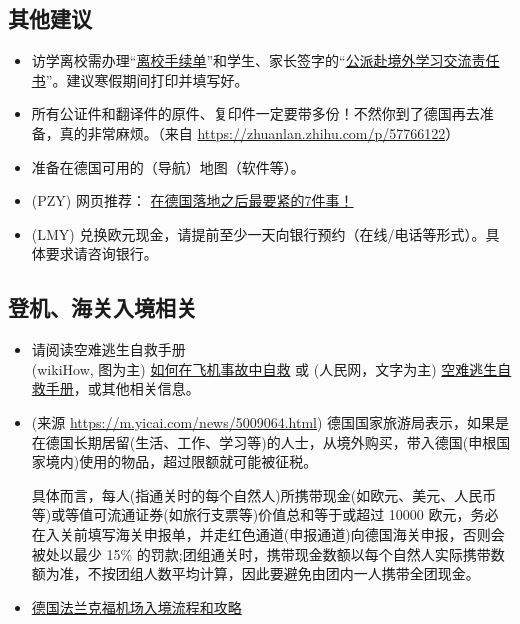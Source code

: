 \documentclass{ctexart}
\begin{document}
\subsection{其他建议}
\begin{itemize}
  \item 访学离校需办理“\href{http://bkjy.ucas.ac.cn/index.php/fxjl/download/3401-2017-06-13-03-47-14?task=down&fid=818}{离校手续单}”和学生、家长签字的“\href{http://bkjy.ucas.ac.cn/index.php/fxjl/download/3400-2017-06-13-03-46-26?task=down&fid=701}{公派赴境外学习交流责任书}”。建议寒假期间打印并填写好。
  \item 所有公证件和翻译件的原件、复印件一定要带多份！不然你到了德国再去准备，真的非常麻烦。（来自 \url{https://zhuanlan.zhihu.com/p/57766122}）
  \item 准备在德国可用的（导航）地图（软件等）。
  \item (PZY) 网页推荐： \href{https://mp.weixin.qq.com/s?srcid=0319fCMV7x6jt2w4xgPGYSMm&scene=23&mid=2651269086&sn=2b9eff5e72b2e989ac404be9be21bc09&idx=2&__biz=MzA4NTM2MzAxNw%3D%3D&chksm=842a97f8b35d1eee47778e42c10d883071d1546d6bab41132685fd4c983a6d713ca70a9b2328&mpshare=1#rd&appinstall=0}{在德国落地之后最要紧的7件事！}
  \item (LMY) 兑换欧元现金，请提前至少一天向银行预约（在线/电话等形式）。具体要求请咨询银行。
\end{itemize}


\subsection{登机、海关入境相关}
\begin{itemize}
\item 请阅读空难逃生自救手册 \\
(wikiHow, 图为主) \href{https://zh.wikihow.com/\%E5\%9C\%A8\%E9\%A3\%9E\%E6\%9C\%BA\%E4\%BA\%8B\%E6\%95\%85\%E4\%B8\%AD\%E8\%87\%AA\%E6\%95\%91}{如何在飞机事故中自救} 或 (人民网，文字为主) \href{http://travel.people.com.cn/n/2014/0725/c41570-25344422.html}{空难逃生自救手册}，或其他相关信息。
\item (来源 \url{https://m.yicai.com/news/5009064.html}) 德国国家旅游局表示，如果是在德国长期居留(生活、工作、学习等)的人士，从境外购买，带入德国(申根国家境内)使用的物品，超过限额就可能被征税。

具体而言，每人(指通关时的每个自然人)所携带现金(如欧元、美元、人民币等)或等值可流通证券(如旅行支票等)价值总和等于或超过 10000 欧元，务必在入关前填写海关申报单，并走红色通道(申报通道)向德国海关申报，否则会被处以最少 15\% 的罚款;团组通关时，携带现金数额以每个自然人实际携带数额为准，不按团组人数平均计算，因此要避免由团内一人携带全团现金。
\item \href{https://bbs.qyer.com/thread-2850836-1.html}{德国法兰克福机场入境流程和攻略}
\end{itemize}
\end{document}
